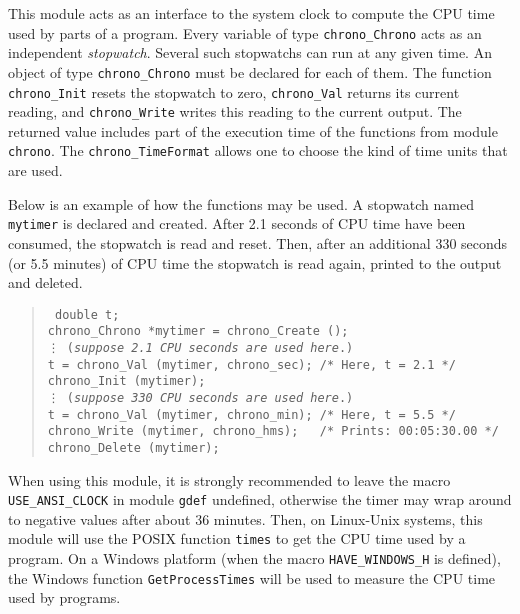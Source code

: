
This module acts as an interface to the system clock to compute the
CPU time used by parts of a program.
Every variable of type {\tt chrono\_Chrono} acts as an independent 
{\em stopwatch}.  Several such stopwatchs can run at any given time.
An object of type {\tt chrono\_Chrono} must be declared 
for each of them.
The function {\tt chrono\_Init} resets the stopwatch to zero,
{\tt chrono\_Val\/} returns its current reading,
and {\tt chrono\_Write\/} writes this reading to the current output.
The returned value includes part of the execution time of the functions
from module {\tt chrono\/}.
The {\tt chrono\_TimeFormat} allows one to choose the kind of 
time units that are used.  

Below is an example of how the functions may be used.
A stopwatch named {\tt mytimer} is declared and created.
After 2.1 seconds of CPU time have been consumed, the stopwatch is read and
reset. Then, after an additional 330 seconds (or 5.5 minutes) of CPU time
the stopwatch is read again, printed to the output and deleted.
%
 \begin{verse}{\tt
  double t; \\
  chrono\_Chrono *mytimer = chrono\_Create (); \\
\hskip 1.0cm   \vdots 
\hskip 1.0cm  ({\em suppose 2.1 CPU seconds are used here}.)\\[6pt]
  t = chrono\_Val (mytimer, chrono\_sec); \qquad   /* Here, t = 2.1 */ \\
  chrono\_Init (mytimer); \\
\hskip 1.0cm  \vdots
\hskip 1.0cm ({\em suppose 330 CPU seconds are used here}.) \\[10pt]
  t = chrono\_Val (mytimer, chrono\_min); \qquad    /* Here, t = 5.5 */\\
  chrono\_Write (mytimer, chrono\_hms);  \qquad\ \  /* Prints: 00:05:30.00 */\\
  chrono\_Delete (mytimer);
 }\end{verse}

When using this module, it is strongly recommended to leave the macro {\tt USE\_ANSI\_CLOCK} 
in module {\tt gdef} undefined, otherwise the timer may %
wrap around to negative values after about 36 minutes.
  Then, on Linux-Unix systems, this module will use the POSIX
  function {\tt times} to get the CPU time used by a program.
  On a Windows platform (when the macro \texttt{HAVE\_WINDOWS\_H} is defined),
  the Windows function \texttt{GetProcessTimes} will be used to measure
  the CPU time used by programs.


